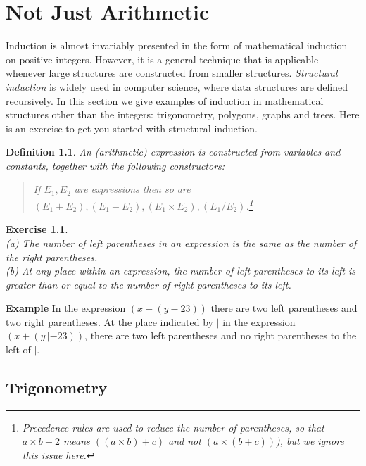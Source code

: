 \documentclass[11pt,a4paper]{report}
\newtheorem{definition}[theorem]{Definition}
\newtheorem{exercise}{Exercise}
\begin{document}

\chapter{Not Just Arithmetic}\label{s.notjust}

Induction is almost invariably presented in the form of mathematical induction on positive integers. However, it is a general technique that is applicable whenever large structures are constructed from smaller structures.  \emph{Structural induction} is widely used in computer science, where data structures are defined recursively. In this section we give examples of induction in mathematical structures other than the integers: trigonometry, polygons, graphs and trees. Here is an exercise to get you started with structural induction.

\begin{definition}
An (arithmetic) \emph{expression} is constructed from variables and constants, together with the following constructors:
\begin{quote}
If $E_1, E_2$ are expressions then so are $(E_1+E_2), (E_1-E_2), (E_1\times E_2), (E_1/E_2)$.\footnote{Precedence rules are used to reduce the number of parentheses, so that $a\times b + 2$ means $((a\times b)+c)$ and not $(a\times (b+c))$), but we ignore this issue here.}
\end{quote}
\end{definition}

\begin{exercise}\mbox{}\\
(a) The number of left parentheses in an expression is the same as the number of the right parentheses.\\
(b) At any place within an expression, the number of left parentheses to its left is greater than or equal to the number of right parentheses to its left. 
\end{exercise}

\textbf{Example} In the expression $(x+(y-23))$ there are two left parentheses and two right parentheses. At the place indicated by $|$ in the expression $(x+(y\,|-23))$, there are two left parentheses and no right parentheses to the left of $|$.

\section{Trigonometry}
\end{document}
